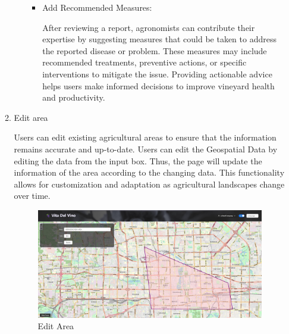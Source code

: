 \begin{enumerate}
\begin{enumerate}
\begin{enumerate}
\begin{itemize}
                                  \item Add Recommended Measures:

                                        After reviewing a report, agronomists can contribute their expertise by suggesting measures that could be taken to address the reported disease or problem. These measures may include recommended treatments, preventive actions, or specific interventions to mitigate the issue. Providing actionable advice helps users make informed decisions to improve vineyard health and productivity.

                              \end{itemize}


                    \end{enumerate}
          
  
         
              \item Edit area

                    Users can edit existing agricultural areas to ensure that the information remains accurate and up-to-date. Users can edit the Geospatial Data by editing the data from the input box. Thus, the page will update the information of the area according to the changing data. This functionality allows for customization and adaptation as agricultural landscapes change over time.

                    \begin{figure}
                        \centering
                        \includegraphics[width=1\linewidth]{images/EditArea.jpg}
                        \caption{Edit Area}
                        \label{fig:EditArea}
                    \end{figure}


\end{enumerate}
\end{enumerate}
